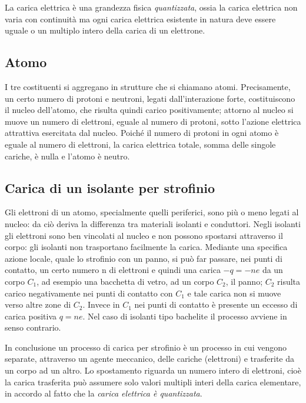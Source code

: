 \documentclass[class=book, crop=false, oneside, 12pt]{standalone}
\begin{document}
La carica elettrica è una grandezza fisica \emph{quantizzata}, ossia la carica elettrica non varia con continuità ma ogni carica elettrica esistente in natura deve essere uguale o un multiplo intero della carica di un elettrone.

\subsection{Atomo}

I tre costituenti si aggregano in strutture che si chiamano atomi. 
Precisamente, un certo numero di protoni e neutroni, legati dall'interazione forte, costituiscono il nucleo dell'atomo, che risulta quindi carico positivamente; attorno al nucleo si muove un numero di elettroni, eguale al numero di protoni, sotto l'azione elettrica attrattiva esercitata dal nucleo. 
Poiché il numero di protoni in ogni atomo è eguale al numero di elettroni, la carica elettrica totale, somma delle singole cariche, è nulla e l'atomo è neutro.

\subsection{Carica di un isolante per strofinio}

Gli elettroni di un atomo, specialmente quelli periferici, sono più o meno legati al nucleo: da ciò deriva la differenza tra materiali isolanti e conduttori. \newline
Negli isolanti gli elettroni sono ben vincolati al nucleo e non possono spostarsi attraverso il corpo: gli isolanti non trasportano facilmente la carica. \newline
Mediante una specifica azione locale, quale lo strofinio con un panno, si può far passare, nei punti di contatto, un certo numero n di elettroni e quindi una carica \(-q = -ne\) da un corpo \(C_1\), ad esempio una bacchetta di vetro, ad un corpo \(C_2\), il panno; 
\(C_2\) risulta carico negativamente nei punti di contatto con \(C_1\) e tale carica non si muove verso altre zone di \(C_2\). 
Invece in \(C_1\) nei punti di contatto è presente un eccesso di carica positiva \(q = ne\). \newline
Nel caso di isolanti tipo bachelite il processo avviene in senso contrario. 

In conclusione un processo di carica per strofinio è un processo in cui vengono separate, attraverso un agente meccanico, delle cariche (elettroni) e trasferite da un corpo ad un altro. 
Lo spostamento riguarda un numero intero di elettroni, cioè la carica trasferita può assumere solo valori multipli interi della carica elementare, in accordo al fatto che la \emph{carica elettrica è quantizzata}.
\end{document}
